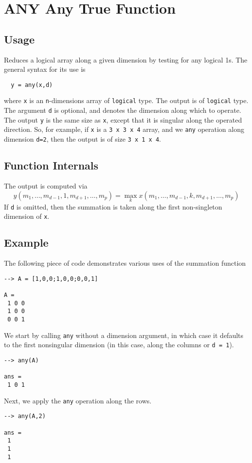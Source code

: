 \section{ANY Any True Function}

\subsection{Usage}

Reduces a logical array along a given dimension by testing for any
logical 1s.  The general 
syntax for its use is
\begin{verbatim}
  y = any(x,d)
\end{verbatim}
where \verb|x| is an \verb|n|-dimensions array of \verb|logical| type.
The output is of \verb|logical| type.  The argument \verb|d| is 
optional, and denotes the dimension along which to operate.
The output \verb|y| is the same size as \verb|x|, except that it is 
singular along the operated direction.  So, for example,
if \verb|x| is a \verb|3 x 3 x 4| array, and we \verb|any| operation along
dimension \verb|d=2|, then the output is of size \verb|3 x 1 x 4|.
\subsection{Function Internals}

The output is computed via
\[
y(m_1,\ldots,m_{d-1},1,m_{d+1},\ldots,m_{p}) = 
\max_{k} x(m_1,\ldots,m_{d-1},k,m_{d+1},\ldots,m_{p})
\]
If \verb|d| is omitted, then the summation is taken along the 
first non-singleton dimension of \verb|x|. 
\subsection{Example}

The following piece of code demonstrates various uses of the summation
function
\begin{verbatim}
--> A = [1,0,0;1,0,0;0,0,1]

A = 
 1 0 0 
 1 0 0 
 0 0 1 
\end{verbatim}
We start by calling \verb|any| without a dimension argument, in which 
case it defaults to the first nonsingular dimension (in this case, 
along the columns or \verb|d = 1|).
\begin{verbatim}
--> any(A)

ans = 
 1 0 1 
\end{verbatim}
Next, we apply the \verb|any| operation along the rows.
\begin{verbatim}
--> any(A,2)

ans = 
 1 
 1 
 1 
\end{verbatim}
